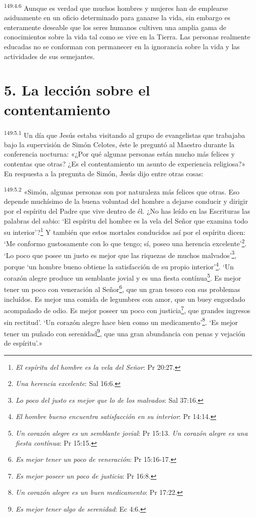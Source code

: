 \par 
\textsuperscript{149:4.6} Aunque es verdad que muchos hombres y mujeres han de emplearse asiduamente en un oficio determinado para ganarse la vida, sin embargo es enteramente deseable que los seres humanos cultiven una amplia gama de conocimientos sobre la vida tal como se vive en la Tierra. Las personas realmente educadas no se conforman con permanecer en la ignorancia sobre la vida y las actividades de sus semejantes.

\section*{5. La lección sobre el contentamiento}
\par 
\textsuperscript{149:5.1} Un día que Jesús estaba visitando al grupo de evangelistas que trabajaba bajo la supervisión de Simón Celotes, éste le preguntó al Maestro durante la conferencia nocturna: «¿Por qué algunas personas están mucho más felices y contentas que otras? ¿Es el contentamiento un asunto de experiencia religiosa?» En respuesta a la pregunta de Simón, Jesús dijo entre otras cosas:

\par 
\textsuperscript{149:5.2} «Simón, algunas personas son por naturaleza más felices que otras. Eso depende muchísimo de la buena voluntad del hombre a dejarse conducir y dirigir por el espíritu del Padre que vive dentro de él. ¿No has leído en las Escrituras las palabras del sabio: `El espíritu del hombre es la vela del Señor que examina todo su interior'?\footnote{\textit{El espíritu del hombre es la vela del Señor}: Pr 20:27.} Y también que estos mortales conducidos así por el espíritu dicen: `Me conformo gustosamente con lo que tengo; sí, poseo una herencia excelente'\footnote{\textit{Una herencia excelente}: Sal 16:6.}. `Lo poco que posee un justo es mejor que las riquezas de muchos malvados'\footnote{\textit{Lo poco del justo es mejor que lo de los malvados}: Sal 37:16.}, porque `un hombre bueno obtiene la satisfacción de su propio interior'\footnote{\textit{El hombre bueno encuentra satisfacción en su interior}: Pr 14:14.}. `Un corazón alegre produce un semblante jovial y es una fiesta contínua\footnote{\textit{Un corazón alegre es un semblante jovial}: Pr 15:13. \textit{Un corazón alegre es una fiesta contínua}: Pr 15:15.}. Es mejor tener un poco con veneración al Señor\footnote{\textit{Es mejor tener un poco de veneración}: Pr 15:16-17.}, que un gran tesoro con sus problemas incluídos. Es mejor una comida de legumbres con amor, que un buey engordado acompañado de odio. Es mejor poseer un poco con justicia\footnote{\textit{Es mejor poseer un poco de justicia}: Pr 16:8.}, que grandes ingresos sin rectitud'. `Un corazón alegre hace bien como un medicamento'\footnote{\textit{Un corazón alegre es un buen medicamento}: Pr 17:22.}. `Es mejor tener un puñado con serenidad\footnote{\textit{Es mejor tener algo de serenidad}: Ec 4:6.}, que una gran abundancia con penas y vejación de espíritu'.»

